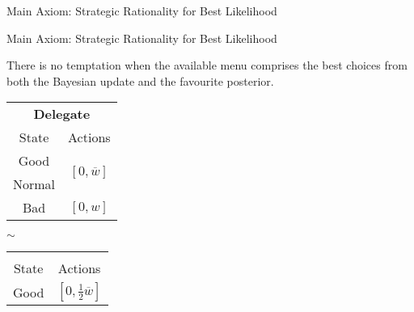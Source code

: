 \documentclass[usenames,dvipsnames,aspectratio=169,11pt, envcountsect, handout]{beamer}
\begin{document}
\begin{frame}[noframenumbering]{Main Axiom: Strategic Rationality for Best Likelihood}
	\begin{flushright}
		\hyperlink{srblapp}{}
	\end{flushright}

\end{frame}

\begin{frame}[noframenumbering]{Main Axiom: Strategic Rationality for Best Likelihood}

	\begin{axiom}
		There is no temptation when the available menu comprises the best choices from both the Bayesian update and the favourite posterior.
	\end{axiom}

	\vfill

	\begin{table}[H]
		\centering
		\begin{minipage}{0.4\textwidth}
			\centering
			\begin{tabular}{c | c}
				\multicolumn{2}{c}{\textbf{Delegate}}                                                     \\
				State                & Actions                                                            \\
				\hline
				{\color{blue}Good}   & \multirow{2}{*}{{\color{blue}\( \left[0, \overline{w} \right] \)}} \\
				{\color{blue}Normal} &                                                                    \\
				Bad                  & \( \left[0, w \right]\)                                            \\
			\end{tabular}
			\vspace{0.5cm} %
		\end{minipage}%
		\( \sim \)
		\begin{minipage}{0.4\textwidth}
			\centering
			\begin{tabular}{c | c}
				\multicolumn{2}{c}{}                                                                                   \\
				State                & Actions                                                                         \\
				\hline
				{\color{blue}Good}   & \multirow{2}{*}{{\color{blue}\( \left[ 0, \frac{1}{2} \overline{w} \right] \)}} \\

\end{tabular}
\end{minipage}
\end{table}
\end{frame}
\end{document}

